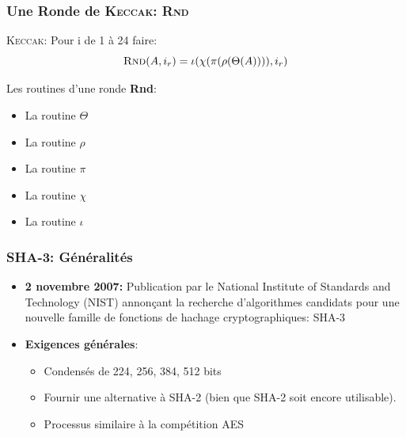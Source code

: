 \begin{frame}
  \frametitle{Une Ronde de \textsc{Keccak}: \textsc{Rnd}}
  \vfill
  \textsc{Keccak}: Pour i de 1 à 24 faire: 
$$\textsc{Rnd}(A,i_r)=\iota ( \chi ( \pi ( \rho (\Theta (A)))), i_r)$$

  \vfill

Les routines d'une ronde \textbf{Rnd}:
  \begin{itemize}
  \item{La routine $\Theta$}
  \item{La routine $\rho$}
  \item{La routine $\pi$}
  \item{La routine $\chi$}
  \item{La routine $\iota$}
   \end{itemize}
  \vfill
\end{frame}

\begin{frame}
  \frametitle{SHA-3: Généralités}
  \vfill
\begin{itemize}
\item{\textbf{2 novembre 2007:} Publication par le National Institute of         Standards and Technology (NIST) annonçant la recherche d'algorithmes candidats pour une nouvelle famille de fonctions de hachage cryptographiques: SHA-3}
  \vfill
        \item{
        \textbf{Exigences générales}:
                \begin{itemize}
                \item{Condensés de 224, 256, 384, 512 bits }
                \item{Fournir une alternative à SHA-2 (bien que SHA-2 soit encore                 utilisable).}
                \item{Processus similaire à la compétition AES}
                \end{itemize}
        }
\end{itemize}
\vfill
\end{frame}

